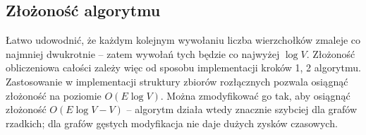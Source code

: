 \documentclass[12pt]{article}
\begin{document}
\subsection*{Złożoność algorytmu}
Łatwo udowodnić, że każdym kolejnym wywołaniu liczba wierzchołków zmaleje co najmniej dwukrotnie – zatem wywołań tych będzie co najwyżej $\log V$. Złożoność obliczeniowa całości zależy więc od sposobu implementacji kroków 1, 2 algorytmu. Zastosowanie w implementacji struktury zbiorów rozłącznych pozwala osiągnąć złożoność na poziomie $O(E\log V)$. Można zmodyfikować go tak, aby osiągnąć złożoność $O(E\log V-V)$ – algorytm działa wtedy znacznie szybciej dla grafów rzadkich; dla grafów gęstych modyfikacja nie daje dużych zysków czasowych.
\end{document}
